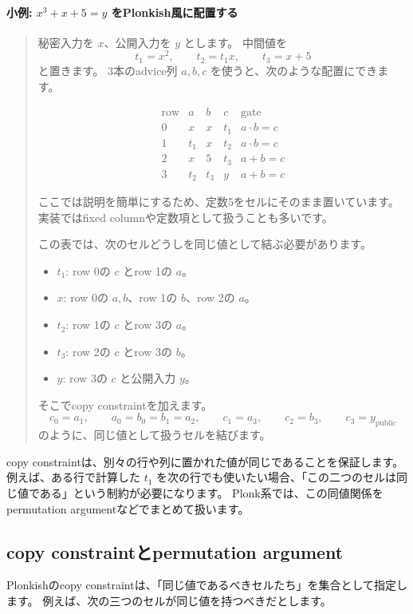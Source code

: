 \documentclass[a4paper,11pt]{ltjsarticle}
\newenvironment{examplebox}[1]{%
  \paragraph*{#1}\begin{quote}
}{%
  \end{quote}
}
\begin{document}
\begin{examplebox}{小例: \(x^3+x+5=y\) をPlonkish風に配置する}
秘密入力を \(x\)、公開入力を \(y\) とします。
中間値を
\[
  t_1=x^2,\qquad t_2=t_1x,\qquad t_3=x+5
\]
と置きます。
3本のadvice列 \(a,b,c\) を使うと、次のような配置にできます。

\[
\begin{array}{c|ccc|l}
\text{row} & a & b & c & \text{gate}\\
\hline
0 & x & x & t_1 & a\cdot b=c\\
1 & t_1 & x & t_2 & a\cdot b=c\\
2 & x & 5 & t_3 & a+b=c\\
3 & t_2 & t_3 & y & a+b=c
\end{array}
\]

ここでは説明を簡単にするため、定数5をセルにそのまま置いています。
実装ではfixed columnや定数項として扱うことも多いです。

この表では、次のセルどうしを同じ値として結ぶ必要があります。
\begin{itemize}
  \item \(t_1\): row 0の \(c\) とrow 1の \(a\)。
  \item \(x\): row 0の \(a,b\)、row 1の \(b\)、row 2の \(a\)。
  \item \(t_2\): row 1の \(c\) とrow 3の \(a\)。
  \item \(t_3\): row 2の \(c\) とrow 3の \(b\)。
  \item \(y\): row 3の \(c\) と公開入力 \(y\)。
\end{itemize}
そこでcopy constraintを加えます。
\[
  c_0=a_1,\qquad a_0=b_0=b_1=a_2,\qquad c_1=a_3,\qquad c_2=b_3,\qquad c_3=y_{\mathrm{public}}
\]
のように、同じ値として扱うセルを結びます。
\end{examplebox}

copy constraintは、別々の行や列に置かれた値が同じであることを保証します。
例えば、ある行で計算した \(t_1\) を次の行でも使いたい場合、「この二つのセルは同じ値である」という制約が必要になります。
Plonk系では、この同値関係をpermutation argumentなどでまとめて扱います。

\subsection{copy constraintとpermutation argument}

Plonkishのcopy constraintは、「同じ値であるべきセルたち」を集合として指定します。
例えば、次の三つのセルが同じ値を持つべきだとします。
\end{document}
